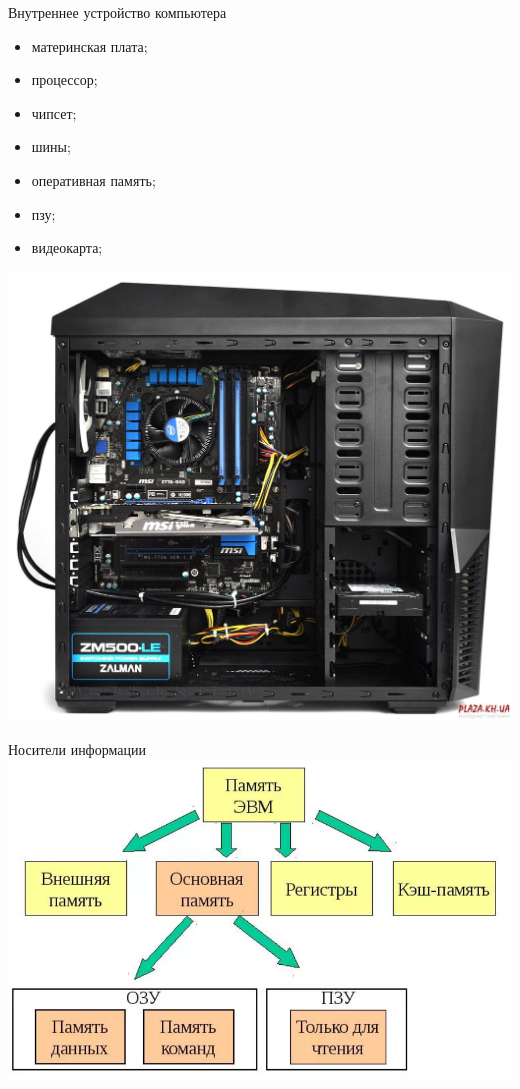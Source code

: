 \documentclass[10pt,pdf,hyperref={unicode}]{beamer}%
\begin{document}
\begin{frame}{Внутреннее устройство компьютера}
  \begin{minipage}{0.4\textwidth}
    \begin{itemize}
    \item материнская плата;
    \item процессор;
    \item чипсет;
    \item шины;
    \item оперативная память;
    \item пзу;
    \item видеокарта;
    \end{itemize}
\end{minipage}
\hfill
  \begin{minipage}{0.4\textwidth}
          \includegraphics[width=\textwidth]{p8.png}
  \end{minipage}
\end{frame}

\begin{frame}{Носители информации}
  \includegraphics[width=\textwidth]{mem_l.png}
\end{frame}
\end{document}
